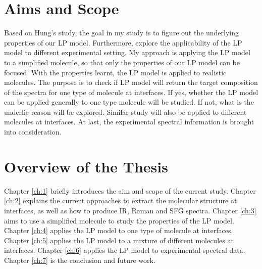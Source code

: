 \section{Aims and Scope}
Based on Hung's study, the goal in my study is to figure out the underlying properties of our LP model. Furthermore, explore the applicability of the LP model to different experimental setting. My approach is applying the LP model to a simplified molecule, so that only the properties of our LP model can be focused. With the properties learnt, the LP model is applied to realistic molecules. The purpose is to check if LP model will return the target composition of the spectra for one type of molecule at interfaces. If yes, whether the LP model can be applied generally to one type molecule will be studied. If not, what is the underlie reason will be explored. Similar study will also be applied to different molecules at interfaces. At last, the experimental spectral information is brought into consideration. \\

\section{Overview of the Thesis}
Chapter \ref{ch:1} briefly introduces the aim and scope of the current study. Chapter \ref{ch:2} explains the current approaches to extract the molecular structure at interfaces, as well as how to produce IR, Raman and SFG spectra. Chapter \ref{ch:3} aims to use a simplified molecule to study the properties of the LP model. Chapter \ref{ch:4} applies the LP model to one type of molecule at interfaces. Chapter \ref{ch:5} applies the LP model to a mixture of different molecules at interfaces. Chapter \ref{ch:6} applies the LP model to experimental spectral data. Chapter \ref{ch:7} is the conclusion and future work.
